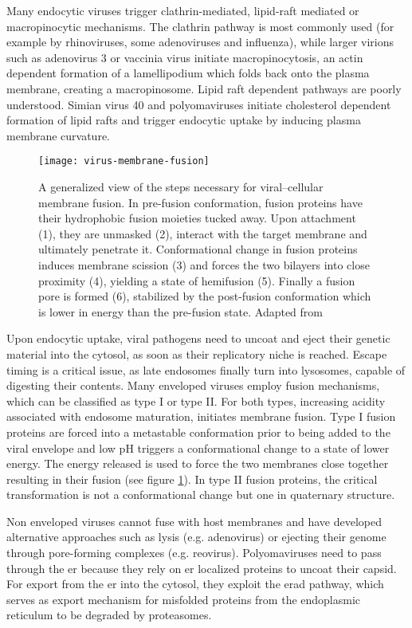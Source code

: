 Many endocytic viruses trigger clathrin-mediated, lipid-raft mediated or ma\-cro\-pi\-no\-cy\-tic mechanisms. The clathrin pathway is most commonly used (for example by rhinoviruses, some adenoviruses and influenza), while larger virions such as adenovirus 3 or vaccinia virus initiate macropinocytosis, an actin dependent formation of a lamellipodium which folds back onto the plasma membrane, creating a macropinosome. Lipid raft dependent pathways are poorly understood. Simian virus 40 and polyomaviruses initiate cholesterol dependent formation of lipid rafts and trigger endocytic uptake by inducing plasma membrane curvature.

\begin{figure}
  \centering
  \texttt{[image: virus-membrane-fusion]}
  \caption[A generalized view of the steps necessary for viral--cellular membrane fusion]{A generalized view of the steps necessary for viral--cellular membrane fusion. In pre-fusion conformation, fusion proteins have their hydrophobic fusion moieties tucked away. Upon attachment (1), they are unmasked (2), interact with the target membrane and ultimately penetrate it. Conformational change in fusion proteins induces membrane scission (3) and forces the two bilayers into close proximity (4), yielding a state of hemifusion (5). Finally a fusion pore is formed (6), stabilized by the post-fusion conformation which is lower in energy than the pre-fusion state. Adapted from \cite{Hulo2011}}
  \label{fig:virus-membrane-fusion}
\end{figure}

Upon endocytic uptake, viral pathogens need to uncoat and eject their genetic material into the cytosol, as soon as their replicatory niche is reached. Escape timing is a critical issue, as late endosomes finally turn into lysosomes, capable of digesting their contents. Many enveloped viruses employ fusion mechanisms, which can be classified as type I or type II. For both types, increasing acidity associated with endosome maturation, initiates membrane fusion. Type I fusion proteins are forced into a metastable conformation prior to being added to the viral envelope and low pH triggers a conformational change to a state of lower energy. The energy released is used to force the two membranes close together resulting in their fusion (see figure \ref{fig:virus-membrane-fusion}). In type II fusion proteins, the critical transformation is not a conformational change but one in quaternary structure.

Non enveloped viruses cannot fuse with host membranes and have developed alternative approaches such as lysis (e.g. adenovirus) or ejecting their genome through pore-forming complexes (e.g. reovirus). Polyomaviruses need to pass through the \gls{er} because they rely on \gls{er} localized proteins to uncoat their capsid. For export from the \gls{er} into the cytosol, they exploit the \gls{erad} pathway, which serves as export mechanism for misfolded proteins from the endoplasmic reticulum to be degraded by proteasomes.

